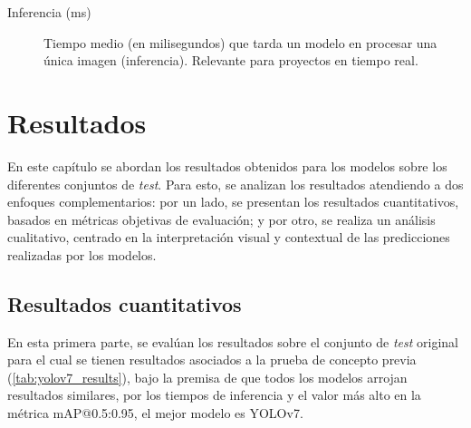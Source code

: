 \documentclass[12pt,a4paper,onecolumn,oneside]{report}
\begin{document}
\begin{description}
  \item[Inferencia (ms)] Tiempo medio (en milisegundos) que tarda un modelo en procesar una única imagen (inferencia). Relevante para proyectos en tiempo real.

\end{description}


\chapter{Resultados} %
\label{Resultados}

En este capítulo se abordan los resultados obtenidos para los modelos sobre los diferentes conjuntos de \textit{test}. Para esto, se analizan 
los resultados atendiendo a dos enfoques complementarios: 
por un lado, se presentan los resultados cuantitativos, basados en métricas objetivas de evaluación; y por otro, se realiza un análisis cualitativo, 
centrado en la interpretación visual y contextual de las predicciones realizadas por los modelos.

\section{Resultados cuantitativos}
\label{sec:Resultados cuantitativos}

En esta primera parte, se evalúan los resultados sobre el conjunto de \textit{test} original para el cual se tienen resultados asociados
a la prueba de concepto previa (\autoref{tab:yolov7_results}), bajo la premisa de que todos los modelos arrojan resultados similares, por los tiempos de inferencia y 
el valor más alto en la métrica mAP@0.5:0.95, el mejor modelo es YOLOv7.

\begin{table}[H]
  \caption{Resultados de los modelos en la prueba de concepto inicial}
  \centering
  \label{tab:yolov7_results}
\end{table}
\end{document}
